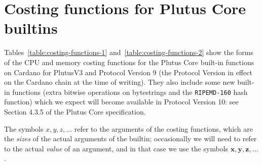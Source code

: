 \documentclass[a4paper]{article}
\begin{document}
\section{Costing functions for Plutus Core builtins}
Tables~\ref{table:costing-functions-1} and~\ref{table:costing-functions-2} show
the forms of the CPU and memory costing functions for the Plutus Core built-in
functions on Cardano for PlutusV3 and Protocol Version 9 (the Protocol Version
in effect on the Cardano chain at the time of writing).  They also include some
new built-in functions (extra bitwise operations on bytestrings and the
\texttt{RIPEMD-160} hash function) which we expect will become available in
Protocol Version 10: see Section 4.3.5 of the Plutus Core specification.

The symbols $x, y, z, \ldots$ refer to the arguments of the costing functions,
which are the \textit{sizes} of the actual arguments of the builtin;
occasionally we will need to refer to the actual \textit{value} of an argument,
and in that case we use the symbols $\mathbf{x}, \mathbf{y}, \mathbf{z},
\ldots$.
\end{document}
